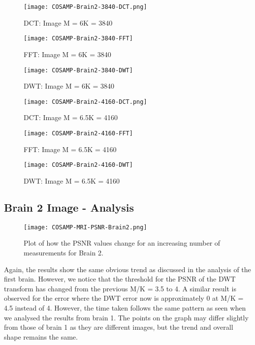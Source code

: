 \documentclass[titlepage,oneside, 12pt]{book}
\theoremstyle{break}
\begin{document}
\begin{figure}[!h]
\centering
{}
  \texttt{[image: COSAMP-Brain2-3840-DCT.png]}
  \caption{DCT: Image M = 6K = 3840}\label{fig:COSAMP-Brain2-3840-DCT}
\endminipage
\hspace*{2em}
  \texttt{[image: COSAMP-Brain2-3840-FFT]}
  \caption{FFT: Image M = 6K = 3840}\label{fig:COSAMP-Brain2-3840-FFT}
\endminipage
\hspace*{2em}
%
  \texttt{[image: COSAMP-Brain2-3840-DWT]}
  \caption{DWT: Image M = 6K = 3840}\label{fig:COSAMP-Brain2-3840-DWT}
\endminipage
\hspace*{2em}
\end{figure}

\begin{figure}[!h]
\centering
{}
  \texttt{[image: COSAMP-Brain2-4160-DCT.png]}
  \caption{DCT: Image M = 6.5K = 4160}\label{fig:COSAMP-Brain2-4160-DCT}
\endminipage
\hspace*{2em}
  \texttt{[image: COSAMP-Brain2-4160-FFT]}
  \caption{FFT: Image M = 6.5K = 4160}\label{fig:COSAMP-Brain2-4160-FFT}
\endminipage
\hspace*{2em}
%
  \texttt{[image: COSAMP-Brain2-4160-DWT]}
  \caption{DWT: Image M = 6.5K = 4160}\label{fig:COSAMP-Brain2-4160-DWT}
\endminipage
\hspace*{2em}
\end{figure}

\clearpage

\subsection{Brain 2 Image - Analysis}

\begin{figure}[H]
\centering
\centerline{\texttt{[image: COSAMP-MRI-PSNR-Brain2.png]}}
\caption{Plot of how the PSNR values change for an increasing number of measurements for Brain 2.}
\label{fig:COSAMP-MRI-PSNR-Brain2}
\end{figure}

Again, the results show the same obvious trend as discussed in the analysis of the first brain. 
However, we notice that the threshold for the PSNR of the DWT transform has changed from the previous M/K = 3.5 to 4. A similar result is observed for the error where the DWT error now is approximately 0 at M/K = 4.5 instead of 4. However, the time taken follows the same pattern as seen when we analysed the results from brain 1. The points on the graph may differ slightly from those of brain 1 as they are different images, but the trend and overall shape remains the same. 
\end{document}
